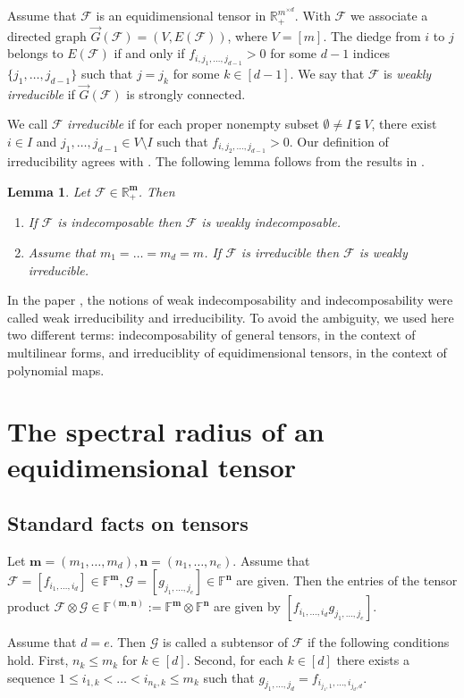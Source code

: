 \documentclass{amsart}
\newcommand{\digraph}{\vec{G}}
\newcommand{\F}{\mathbb{F}}
\newcommand{\R}{\mathbb{R}}
\newcommand{\m}{\mathbf{m}}
\newcommand{\n}{\mathbf{n}}
\newcommand{\0}{\mathbf{0}}
\newcommand{\1}{\mathbf{1}}
\newcommand{\cF}{\mathcal{F}}
\newcommand{\cG}{\mathcal{G}}
\newtheorem{lemma}[theo]{Lemma}
\theoremstyle{remark}
\numberwithin{equation}{section} %
\renewcommand{\leq}{\leqslant}
\renewcommand{\le}{\leqslant}
\begin{document}
 Assume that $\cF$ is an equidimensional tensor in $\R_+^{m^{\times d}}$.
 With $\cF$ we associate a directed graph $\digraph(\cF)=(V, E(\cF))$, where $V=[m]$.  The diedge from $i$ to $j$ belongs to $E(\cF)$
 if and only if $f_{i,j_1,\ldots,j_{d-1}}>0$ for some $d-1$ indices $\{j_1,\ldots,j_{d-1}\}$ such that $j=j_k$ for some $k\in[d-1]$.
 We say that $\cF$ is {\em weakly irreducible} if $\digraph(\cF)$ is strongly connected.

 We call $\cF$ \emph{irreducible} if for each proper nonempty subset
 $\emptyset \ne I\subsetneqq V$,
 there exist $i\in I$ and %
$j_1,\ldots,j_{d-1}\in V\setminus I$
 such that $f_{i,j_2,\ldots,j_{d-1}}>0$.
 Our definition of irreducibility agrees with \cite{Lim05,CPZ08,NQZ09}.
 The following lemma follows from the results in \cite{FGH}. 
 \begin{lemma}\label{strngimpweak}  Let $\cF\in \R_+^\m$.  Then
 \begin{enumerate}
 \item If $\cF$ is indecomposable then $\cF$ is weakly indecomposable.
 \item Assume that $m_1=\ldots=m_d=m$.  If $\cF$ is irreducible then $\cF$ is weakly irreducible.
 \end{enumerate}
 \end{lemma}

 In the paper \cite{FGH}, the notions of weak indecomposability and indecomposability were called weak irreducibility
 and irreducibility.  To avoid the ambiguity, we used here two different terms: indecomposability of general
 tensors, in the context of multilinear forms, and irreduciblity of equidimensional tensors, in the context of polynomial maps.

 \section{The spectral radius of an equidimensional tensor}\label{sec:varspecrad}
 \subsection{Standard facts on tensors}
 Let $\m=(m_1,\ldots,m_d), \n=(n_1,\ldots,n_e)$.
  Assume that $\cF=[f_{i_1,\ldots,i_d}]\in\F^{\m},\cG=[g_{j_1,\ldots,j_e}]\in \F^{\n}$ are given.  Then the entries of the tensor product $\cF\otimes\cG\in\F^{(\m,\n)}:=\F^{\m}\otimes \F^{\n}$ are given by $ [f_{i_1,\ldots,i_d}g_{j_1,\ldots,j_e}]$.
  
Assume that $d=e$.  Then $\cG$ is called a subtensor of $\cF$ if the following conditions hold. First, $n_k\le m_k$ for $k\in [d]$.  Second,   for each $k\in[d]$ there exists a sequence 
$1\leq i_{1,k}<\ldots<i_{n_k,k}\leq m_k$ such that $g_{j_1,\ldots,j_d}=f_{i_{j_1,1},\ldots,i_{j_d,d}}$.
%
\end{document}
